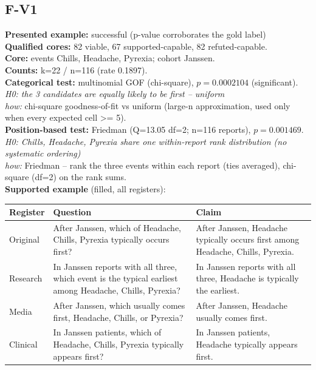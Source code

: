 \documentclass[11pt]{article}
\begin{document}
\subsection*{F-V1}
\textbf{Presented example:} successful (p-value corroborates the gold label) \\
\textbf{Qualified cores:} 82 viable, 67 supported-capable, 82 refuted-capable. \\
\textbf{Core:} events Chills, Headache, Pyrexia; cohort Janssen. \\
\textbf{Counts:} k=22 / n=116  (rate 0.1897). \\
\textbf{Categorical test:} multinomial GOF (chi-square), $p = 0.0002104$ (significant). \\
\emph{H0: the 3 candidates are equally likely to be first -- uniform} \\
\emph{how:} chi-square goodness-of-fit vs uniform (large-n approximation, used only when every expected cell >= 5). \\
\textbf{Position-based test:} Friedman (Q=13.05 df=2; n=116 reports), $p = 0.001469$. \\
\emph{H0: Chills, Headache, Pyrexia share one within-report rank distribution (no systematic ordering)} \\
\emph{how:} Friedman -- rank the three events within each report (ties averaged), chi-square (df=2) on the rank sums. \\
\textbf{Supported example} (filled, all registers): \\
\begin{tabularx}{\linewidth}{@{}l L L@{}}
\toprule
\textbf{Register} & \textbf{Question} & \textbf{Claim} \\
\midrule
Original & After Janssen, which of Headache, Chills, Pyrexia typically occurs first? & After Janssen, Headache typically occurs first among Headache, Chills, Pyrexia. \\
Research & In Janssen reports with all three, which event is the typical earliest among Headache, Chills, Pyrexia? & In Janssen reports with all three, Headache is typically the earliest. \\
Media & After Janssen, which usually comes first, Headache, Chills, or Pyrexia? & After Janssen, Headache usually comes first. \\
Clinical & In Janssen patients, which of Headache, Chills, Pyrexia typically appears first? & In Janssen patients, Headache typically appears first. \\
\bottomrule
\end{tabularx}
\end{document}
